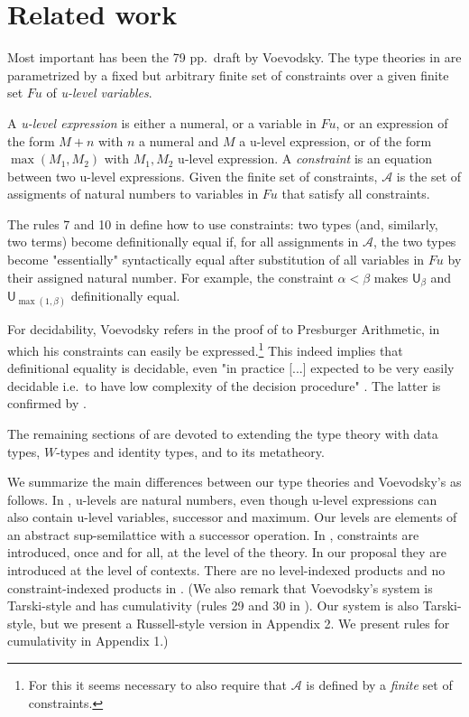 \documentclass[11pt,a4paper]{article}
\theoremstyle{definition}
\newcommand{\UU}{\mathsf{U}}
\newcommand{\AFu}{\mathcal{A}}
\newcommand{\Fu}{\mathit{Fu}}
\begin{document}
\section{Related work}\label{sec:related}

Most important has been the 79 pp.\ draft \cite{VV} by Voevodsky.
The type theories in \cite{VV} are parametrized 
by a fixed but arbitrary finite set of constraints over a given finite
set $\Fu$ of \emph{u-level variables}. 

A \emph{u-level expression} \cite[Def. 2.0.2]{VV} is either a numeral,
or a variable in $\Fu$, or an expression of the form $M+n$ with $n$ 
a numeral and $M$ a u-level expression, or of the form $\max(M_1,M_2)$
with $M_1,M_2$ u-level expression. A \emph{constraint} is an equation 
between two u-level expressions. Given the finite set of constraints,
$\AFu$ is the set of assigments of natural numbers to variables
in $\Fu$ that satisfy all constraints.

The rules 7 and 10 in \cite[Sec. 3.4]{VV} define how to use constraints:
two types (and, similarly, two terms) become definitionally equal 
if, for all assignments in $\AFu$, the two types become "essentially"
syntactically equal after substitution of all variables in $\Fu$ by 
their assigned natural number. For example, the constraint
$\alpha < \beta$ makes $\UU_\beta$ and $\UU_{\max(1,\beta)}$
definitionally equal.

For decidability, Voevodsky refers in the proof of
\cite[Lemma 2.0.4, proof]{VV} to Presburger Arithmetic,
in which his constraints can easily be expressed.\footnote{%
For this it seems necessary to also require that $\AFu$
is defined by a \emph{finite} set of constraints.}%
This indeed implies that definitional equality is decidable, even
"in practice [...] expected to be very easily decidable i.e.\ 
to have low complexity of the decision procedure"
\cite[p.\ 5, l.\ -13]{VV}. 
The latter is confirmed by \cite{bezem-coquand:lattices}.

The remaining sections of \cite{VV} are devoted to extending the
type theory with data types, $W$-types and identity types,
and to its metatheory.

We summarize the main differences between our type theories 
and Voevodsky's as follows.
%
In \cite{VV}, u-levels are natural numbers, even though u-level
expressions can also contain u-level variables, successor and maximum.
Our levels are elements of an abstract sup-semilattice with a successor
operation. 
%
In \cite{VV}, constraints are introduced, once and for all,
at the level of the theory. In our proposal they are introduced
at the level of contexts.
There are no level-indexed products and no constraint-indexed products in \cite{VV}.
%
%
(We also remark that Voevodsky's system is Tarski-style and has cumulativity (rules 29 and 30 in \cite[Sec. 3.4]{VV}). Our system is also Tarski-style, but we present a Russell-style version in Appendix 2. We present rules for cumulativity in Appendix 1.)
\end{document}
